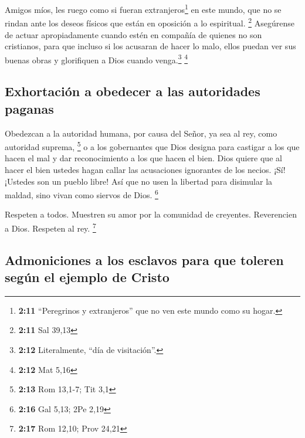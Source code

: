  Amigos míos, les ruego como si fueran
extranjeros\footnote{\textbf{2:11} ``Peregrinos y extranjeros'' que no
  ven este mundo como su hogar.} en este mundo, que no se rindan ante
los deseos físicos que están en oposición a lo espiritual. \footnote{\textbf{2:11}
  Sal 39,13}  Asegúrense de actuar apropiadamente cuando
estén en compañía de quienes no son cristianos, para que incluso si los
acusaran de hacer lo malo, ellos puedan ver sus buenas obras y
glorifiquen a Dios cuando venga.\footnote{\textbf{2:12} Literalmente,
  ``día de visitación''.} \footnote{\textbf{2:12} Mat 5,16}

\hypertarget{exhortaciuxf3n-a-obedecer-a-las-autoridades-paganas}{%
\subsection{Exhortación a obedecer a las autoridades
paganas}\label{exhortaciuxf3n-a-obedecer-a-las-autoridades-paganas}}

 Obedezcan a la autoridad humana, por causa del Señor, ya
sea al rey, como autoridad suprema, \footnote{\textbf{2:13} Rom 13,1-7;
  Tit 3,1}  o a los gobernantes que Dios designa para
castigar a los que hacen el mal y dar reconocimiento a los que hacen el
bien.  Dios quiere que al hacer el bien ustedes hagan
callar las acusaciones ignorantes de los necios.  ¡Sí!
¡Ustedes son un pueblo libre! Así que no usen la libertad para disimular
la maldad, sino vivan como siervos de Dios. \footnote{\textbf{2:16} Gal
  5,13; 2Pe 2,19}

 Respeten a todos. Muestren su amor por la comunidad de
creyentes. Reverencien a Dios. Respeten al rey. \footnote{\textbf{2:17}
  Rom 12,10; Prov 24,21}

\hypertarget{admoniciones-a-los-esclavos-para-que-toleren-seguxfan-el-ejemplo-de-cristo}{%
\subsection{Admoniciones a los esclavos para que toleren según el
ejemplo de
Cristo}\label{admoniciones-a-los-esclavos-para-que-toleren-seguxfan-el-ejemplo-de-cristo}}


